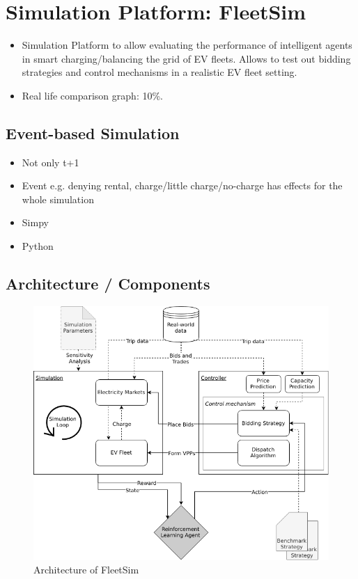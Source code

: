 \documentclass[a4paper, 12pt]{article}
\begin{document}
\section{Simulation Platform: FleetSim}
\label{sec:org6fb8b62}
\begin{itemize}
\item Simulation Platform to allow evaluating the performance of intelligent agents
in smart charging/balancing the grid of EV fleets. Allows to test out bidding strategies
and control mechanisms in a realistic EV fleet setting.
\item Real life comparison graph: 10\%.
\end{itemize}
\subsection{Event-based Simulation}
\label{sec:org752b2c3}
\begin{itemize}
\item Not only t+1
\item Event e.g. denying rental, charge/little charge/no-charge has effects for the
whole simulation
\item Simpy
\item Python
\end{itemize}
\subsection{Architecture / Components}
\label{sec:org7577bf9}
\begin{figure}[htbp]
\centering
\includegraphics[width=1\linewidth]{./fig/simulation_platform.png}
\caption[FleetSim Architecture]{Architecture of FleetSim \label{fig-fleetsim}}
\end{figure}
\end{document}
